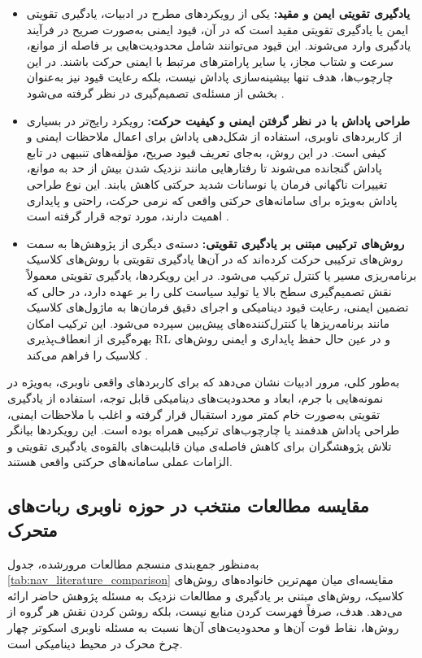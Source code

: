 \begin{itemize}
\item{\textbf{یادگیری تقویتی ایمن و مقید:}}
یکی از رویکردهای مطرح در ادبیات، یادگیری تقویتی ایمن%
 یا یادگیری تقویتی مقید%
%
 است که در آن، قیود ایمنی به‌صورت صریح در فرآیند یادگیری وارد می‌شوند. این قیود می‌توانند شامل محدودیت‌هایی بر فاصله از موانع، سرعت و شتاب مجاز، یا سایر پارامترهای مرتبط با ایمنی حرکت باشند. در این چارچوب‌ها، هدف تنها بیشینه‌سازی پاداش نیست، بلکه رعایت قیود نیز به‌عنوان بخشی از مسئله‌ی تصمیم‌گیری در نظر گرفته می‌شود %
\cite{Alsolami2025AutonomousNavigationSurvey}.

\item{\textbf{طراحی پاداش با در نظر گرفتن ایمنی و کیفیت حرکت:}}
رویکرد رایج‌تر در بسیاری از کاربردهای ناوبری، استفاده از شکل‌دهی پاداش%
 برای اعمال ملاحظات ایمنی و کیفی است. در این روش، به‌جای تعریف قیود صریح، مؤلفه‌های تنبیهی در تابع پاداش گنجانده می‌شوند تا رفتارهایی مانند نزدیک شدن بیش از حد به موانع، تغییرات ناگهانی فرمان یا نوسانات شدید حرکتی کاهش یابند. این نوع طراحی پاداش به‌ویژه برای  سامانه‌های حرکتی واقعی که نرمی حرکت، راحتی و پایداری اهمیت دارند، مورد توجه قرار گرفته است%
\cite{Le2024DRLNavigationSurvey}.

\item{\textbf{روش‌های ترکیبی مبتنی بر یادگیری تقویتی:}}
دسته‌ی دیگری از پژوهش‌ها به سمت روش‌های ترکیبی%
 حرکت کرده‌اند که در آن‌ها یادگیری تقویتی با روش‌های کلاسیک برنامه‌ریزی مسیر یا کنترل ترکیب می‌شود. در این رویکردها، یادگیری تقویتی معمولاً نقش تصمیم‌گیری سطح بالا یا تولید سیاست کلی را بر عهده دارد، در حالی که تضمین ایمنی، رعایت قیود دینامیکی و اجرای دقیق فرمان‌ها به ماژول‌های کلاسیک مانند برنامه‌ریزها یا کنترل‌کننده‌های پیش‌بین سپرده می‌شود. این ترکیب امکان بهره‌گیری از انعطاف‌پذیری RL و در عین حال حفظ پایداری و ایمنی روش‌های کلاسیک را فراهم می‌کند %
\cite{Alsolami2025AutonomousNavigationSurvey}.
\end{itemize}
به‌طور کلی، مرور ادبیات نشان می‌دهد که برای کاربردهای واقعی ناوبری، به‌ویژه در نمونه‌هایی با جرم، ابعاد و محدودیت‌های دینامیکی قابل توجه، استفاده از یادگیری تقویتی به‌صورت خام کمتر مورد استقبال قرار گرفته و اغلب با ملاحظات ایمنی، طراحی پاداش هدفمند یا چارچوب‌های ترکیبی همراه بوده است. این رویکردها بیانگر تلاش پژوهشگران برای کاهش فاصله‌ی میان قابلیت‌های بالقوه‌ی یادگیری تقویتی و الزامات عملی سامانه‌های حرکتی واقعی هستند.
\subsection{مقایسه مطالعات منتخب در حوزه ناوبری ربات‌های متحرک}
به‌منظور جمع‌بندی منسجم مطالعات مرورشده، جدول \ref{tab:nav_literature_comparison} مقایسه‌ای میان مهم‌ترین خانواده‌های روش‌های کلاسیک، روش‌های مبتنی بر یادگیری و مطالعات نزدیک به مسئله پژوهش حاضر ارائه می‌دهد. هدف، صرفاً فهرست کردن منابع نیست، بلکه روشن کردن نقش هر گروه از روش‌ها، نقاط قوت آن‌ها و محدودیت‌های آن‌ها نسبت به مسئله ناوبری اسکوتر چهار چرخ محرک در محیط دینامیکی است.

